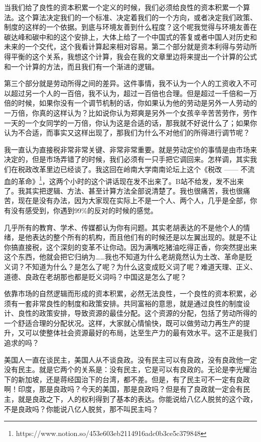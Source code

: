 \documentclass[UTF8, 12pt, a4paper]{ctexrep}
\begin{document}
当我们给了良性的资本积累一个定义的时候，我们必须给良性的资本积累一个算法。这个算法决定我们的一个标准、决定着我们的一个方向，或者决定我们政策、制度的这样的一个依据。到底与环境友善到什么程度？这个呢我觉得与环境友善在碳达峰和碳中和的这个安排上，大体上给了一个中国式的答复或者中国人对历史和未来的一个交代，这个我看计算起来相对容易。第二个部分就是资本利得与劳动所得平衡的这个关系，我想这个计算，我会在我的文章里边将来提出一个计算的公式和一个计算的方法，而且我们有一个渐进的逻辑。

第三个部分就是劳动所得之间的差异。这件事情，我不认为一个人的工资收入不可以超过另一个人的一百倍，我不认为，超过一百倍也合理。但是超过一千倍和一万倍的时候，如果你没有一个调节机制的话，你如果认为他的劳动是另外一人劳动的一万倍，你真的这样认为？比如说你认为郑爽是另外一个女孩辛辛苦苦劳作，劳作一天的一个女同学的一万倍，你认为这是合适的话，那我就不好说什么了；如果你认为不合适，而事实又这样出现了，那我们为什么不对他们的所得进行调节呢？

我一直认为直接税非常非常关键、非常非常重要。就是劳动定价的事情是由市场来决定的，但是市场弄错了的时候，我们必须有一只手把它调回来。怎样调，其实我们在税政改革里边已经谈了。我这回在岭南大学南南论坛上这个《税改 —— 不流血的革命》\footnote{https://www.notion.so/453e603eb2114916adc0b3ce5c379848}，这两个小时的这个讲话现在发不出来了。B站不给发，发不出来了。我其实把逻辑、方法、甚至计算方法全部说清楚了。我也很痛苦，我也很痛苦，现在是没有办法，因为大家现在实际上不是一个人、两个人，几乎是全部，你有没有感受到，你遇到99\%的反对的时候的感觉。

几乎所有的教育、学术、传媒都认为你有问题。其实老胡表达的不是他个人的情绪，是他表达的整个所有的机构，而且他们有的时候还是以左翼出现的。就是不让你搞直接税，这个深刻的变革不让你动。因为满嘴吃猪油吃得正香，你突然提出来这个东西，他就会把它归纳为……我也不知道为什么老胡竟然认为土改、革命是贬义词？不知道为什么？是怎么了呢？为什么这变成贬义词了呢？难道天理、正义、道德、良政在老胡那也都是贬义词吗？中国这是怎么了呢？

依靠市场的自然逻辑而形成的资本积累，必然无法良性，一个良性的资本积累，必须有一套非常良性的制度和政策安排。共同富裕的意思，就是通过良性的制度设计、良性的政策安排，导致资源的最佳分配。这个资源的分配，包括了劳动所得的一个舒适合理的分配状况。这样，大家就心情愉快，既可以做劳动力再生产的提升，又可以使整体社会资源最好的布局，达至生产力的最有效水平。这不正是我们追求的吗？

美国人一直在谈民主，美国人从不谈良政。没有民主可以有良政，没有良政他一定没有民主。就是它两个的关系是：没有民主，它是可以有良政的。无论是李光耀治下的新加坡，还是蒋经国治下的台湾，都不差。但是，有了民主可不一定有良政啊！印度，那是良政吗？今天的美国，那是良政吗？但是有了良政就一定会有民主，就是良政之下，人的权利得到了基本的表达。你能说给八亿人脱贫的这个政，不是良政吗？你能说八亿人脱贫，那不叫民主吗？
\end{document}
